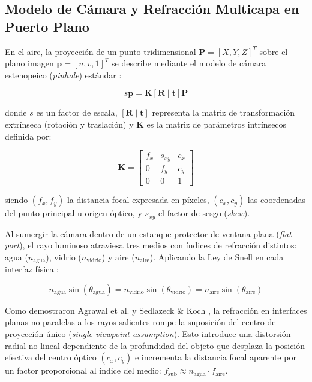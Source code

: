 \documentclass[12pt,letterpaper,spanish,twoside,openright]{report}
\begin{document}
\subsection{Modelo de Cámara y Refracción Multicapa en Puerto Plano}

En el aire, la proyección de un punto tridimensional $\mathbf{P} = [X, Y, Z]^T$ sobre el plano imagen $\mathbf{p} = [u, v, 1]^T$ se describe mediante el modelo de cámara estenopeico (\textit{pinhole}) estándar \parencite{calZhang}:

\begin{equation}
s \mathbf{p} = \mathbf{K} [\mathbf{R} \mid \mathbf{t}] \mathbf{P}
\end{equation}

donde $s$ es un factor de escala, $[\mathbf{R} \mid \mathbf{t}]$ representa la matriz de transformación extrínseca (rotación y traslación) y $\mathbf{K}$ es la matriz de parámetros intrínsecos definida por:

\begin{equation}
\mathbf{K} = \begin{bmatrix} f_x & s_{xy} & c_x \\ 0 & f_y & c_y \\ 0 & 0 & 1 \end{bmatrix}
\end{equation}

siendo $(f_x, f_y)$ la distancia focal expresada en píxeles, $(c_x, c_y)$ las coordenadas del punto principal u origen óptico, y $s_{xy}$ el factor de sesgo (\textit{skew}).

Al sumergir la cámara dentro de un estanque protector de ventana plana (\textit{flat-port}), el rayo luminoso atraviesa tres medios con índices de refracción distintos: agua ($n_{\text{agua}}$), vidrio ($n_{\text{vidrio}}$) y aire ($n_{\text{aire}}$). Aplicando la Ley de Snell en cada interfaz física \parencite{Agrawal2012, Sedlazeck2012}:

\begin{equation}
n_{\text{agua}} \sin(\theta_{\text{agua}}) = n_{\text{vidrio}} \sin(\theta_{\text{vidrio}}) = n_{\text{aire}} \sin(\theta_{\text{aire}})
\end{equation}

Como demostraron Agrawal et al. \parencite{Agrawal2012} y Sedlazeck \& Koch \parencite{Sedlazeck2012}, la refracción en interfaces planas no paralelas a los rayos salientes rompe la suposición del centro de proyección único (\textit{single viewpoint assumption}). Esto introduce una distorsión radial no lineal dependiente de la profundidad del objeto que desplaza la posición efectiva del centro óptico $(c_x, c_y)$ e incrementa la distancia focal aparente por un factor proporcional al índice del medio: $f_{\text{sub}} \approx n_{\text{agua}} \cdot f_{\text{aire}}$.
\end{document}

